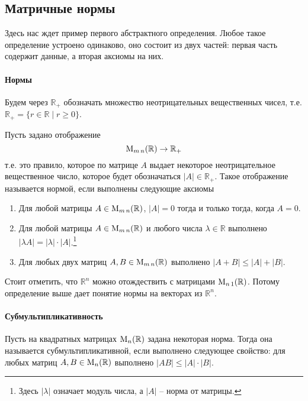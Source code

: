 \subsection{Матричные нормы}

Здесь нас ждет пример первого абстрактного определения. Любое такое определение устроено одинаково, оно состоит из двух частей: первая часть содержит данные, а вторая аксиомы на них.



\paragraph{Нормы}
Будем через $\mathbb R_+$ обозначать множество неотрицательных вещественных чисел, т.е. $\mathbb R_+ = \{r\in \mathbb R\mid r \geqslant 0\}$. 


Пусть задано отображение 
\[
\operatorname{M}_{m\,n}(\mathbb R)\to \mathbb R_+
\]
т.е. это правило, которое по матрице $A$ выдает некоторое неотрицательное вещественное число, которое будет обозначаться $|A|\in\mathbb R_+$. Такое отображение называется нормой, если выполнены следующие аксиомы
\begin{enumerate}
\item Для любой матрицы $A\in\operatorname{M}_{m\,n}(\mathbb R)$, $|A| = 0$ тогда и только тогда, когда $A = 0$.

\item Для любой матрицы $A\in\operatorname{M}_{m\,n}(\mathbb R)$ и любого числа $\lambda\in\mathbb R$ выполнено $|\lambda A| = |\lambda| \cdot |A|$.\footnote{Здесь $|\lambda|$ означает модуль числа, а $|A|$ -- норма от матрицы.}

\item Для любых двух матриц $A, B \in\operatorname{M}_{m\,n}(\mathbb R)$ выполнено $|A + B|\leqslant |A| + |B|$.
\end{enumerate}


Стоит отметить, что $\mathbb R^n$ можно отождествить с матрицами $\operatorname{M}_{n\,1}(\mathbb R)$. Потому определение выше дает понятие нормы на векторах из $\mathbb R^n$.


\paragraph{Субмультипликативность}
Пусть на квадратных матрицах $\operatorname{M}_{n}(\mathbb R)$ задана некоторая норма. Тогда она называется субмультипликативной, если выполнено следующее свойство: для любых матриц $A, B\in\operatorname{M}_{n}(\mathbb R)$ выполнено $|AB|\leqslant |A|\cdot |B|$.



